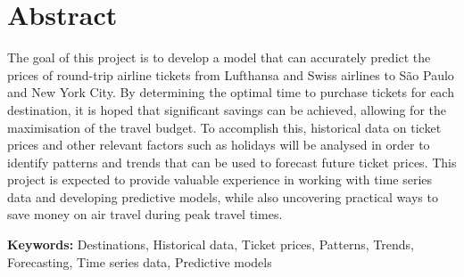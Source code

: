 \section*{Abstract}
The goal of this project is to develop a model that can accurately predict the prices of round-trip airline tickets from Lufthansa and Swiss airlines to São Paulo and New York City. By determining the optimal time to purchase tickets for each destination, it is hoped that significant savings can be achieved, allowing for the maximisation of the travel budget. To accomplish this, historical data on ticket prices and other relevant factors such as holidays will be analysed in order to identify patterns and trends that can be used to forecast future ticket prices. This project is expected to provide valuable experience in working with time series data and developing predictive models, while also uncovering practical ways to save money on air travel during peak travel times.

\vspace{.5cm}

\textbf{Keywords:} Destinations, Historical data, Ticket prices, Patterns, Trends, Forecasting, Time series data, Predictive models
\newpage